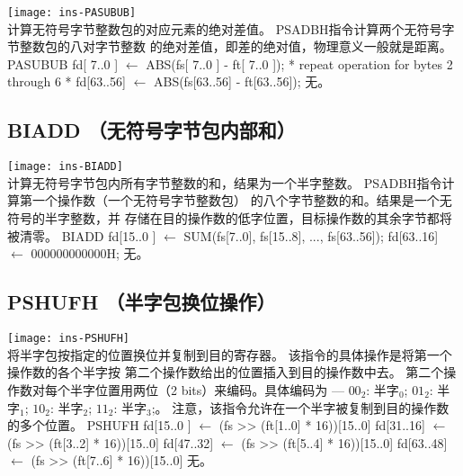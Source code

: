 \begin{instructionblk}
  \texttt{[image: ins-PASUBUB]} \\
  {计算无符号字节整数包的对应元素的绝对差值。}
  {PSADBH指令计算两个无符号字节整数包的八对字节整数
  的绝对差值，即差的绝对值，物理意义一般就是距离。}
  {PASUBUB \narrownewline
  fd[ 7..0 ] $\leftarrow$ ABS(fs[ 7..0 ] - ft[ 7..0 ]); \narrownewline
  * repeat operation for bytes 2 through 6 * \narrownewline
  fd[63..56] $\leftarrow$ ABS(fs[63..56] - ft[63..56]);}
  {无。}
\end{instructionblk}

\subsection{BIADD （无符号字节包内部和）}

\begin{instructionblk}
  \texttt{[image: ins-BIADD]} \\
  {计算无符号字节包内所有字节整数的和，结果为一个半字整数。}
  {PSADBH指令计算第一个操作数（一个无符号字节整数包）
  的八个字节整数的和。结果是一个无符号的半字整数，并
  存储在目的操作数的低字位置，目标操作数的其余字节都将
  被清零。}
  {BIADD \narrownewline
  fd[15..0 ] $\leftarrow$ SUM(fs[7..0], fs[15..8], ..., fs[63..56]); \narrownewline
  fd[63..16] $\leftarrow$ 000000000000H;}
  {无。}
\end{instructionblk}

\subsection{PSHUFH （半字包换位操作）}

\begin{instructionblk}
  \texttt{[image: ins-PSHUFH]} \\
  {将半字包按指定的位置换位并复制到目的寄存器。}
  {该指令的具体操作是将第一个操作数的各个半字按
  第二个操作数给出的位置插入到目的操作数中去。
  第二个操作数对每个半字位置用两位（2 bits）来编码。具体编码为 --- $00_2$:
  半字$_0$; $01_2$: 半字$_1$; $10_2$: 半字$_2$; $11_2$: 半字$_3$;。
  注意，该指令允许在一个半字被复制到目的操作数的多个位置。}
  {PSHUFH \narrownewline
  fd[15..0 ] $\leftarrow$ (fs >> (ft[1..0] * 16))[15..0] \narrownewline
  fd[31..16] $\leftarrow$ (fs >> (ft[3..2] * 16))[15..0] \narrownewline
  fd[47..32] $\leftarrow$ (fs >> (ft[5..4] * 16))[15..0] \narrownewline
  fd[63..48] $\leftarrow$ (fs >> (ft[7..6] * 16))[15..0]}
  {无。}
\end{instructionblk}

